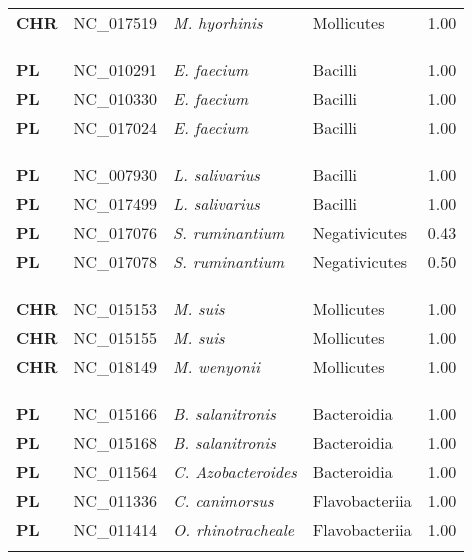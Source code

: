 \begin{adjustwidth}{-3cm}{2cm}
{\begin{supertabular}{>{\bfseries}l|p{0.1\textwidth}p{0.14\textwidth}l|l}
CHR & NC\_017519 & \textit{M. hyorhinis} & Mollicutes & 1.00\\
\\
\\
\hline\\
PL & NC\_010291 & \textit{E. faecium} & Bacilli & 1.00\\
PL & NC\_010330 & \textit{E. faecium} & Bacilli & 1.00\\
PL & NC\_017024 & \textit{E. faecium} & Bacilli & 1.00\\
\\
\\
\hline\\
PL & NC\_007930 & \textit{L. salivarius} & Bacilli & 1.00\\
PL & NC\_017499 & \textit{L. salivarius} & Bacilli & 1.00\\
PL & NC\_017076 & \textit{S. ruminantium} & Negativicutes & 0.43\\
PL & NC\_017078 & \textit{S. ruminantium} & Negativicutes & 0.50\\
\\
\\
\hline\\
CHR & NC\_015153 & \textit{M. suis} & Mollicutes & 1.00\\
CHR & NC\_015155 & \textit{M. suis} & Mollicutes & 1.00\\
CHR & NC\_018149 & \textit{M. wenyonii} & Mollicutes & 1.00\\
\\
\\
\hline\\
PL & NC\_015166 & \textit{B. salanitronis} & Bacteroidia & 1.00\\
PL & NC\_015168 & \textit{B. salanitronis} & Bacteroidia & 1.00\\
PL & NC\_011564 & \textit{C. Azobacteroides} & Bacteroidia & 1.00\\
PL & NC\_011336 & \textit{C. canimorsus} & Flavobacteriia & 1.00\\
PL & NC\_011414 & \textit{O. rhinotracheale} & Flavobacteriia & 1.00\\
\\

\end{supertabular}}
\end{adjustwidth}
